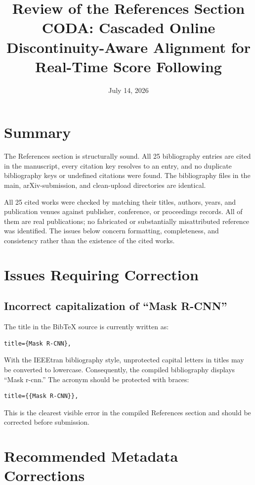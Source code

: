 \documentclass[11pt]{article}
\title{Review of the References Section\\\large CODA: Cascaded Online Discontinuity-Aware Alignment for Real-Time Score Following}
\author{}
\date{July 14, 2026}
\begin{document}
\maketitle

\section{Summary}

The References section is structurally sound. All 25 bibliography entries are cited in the manuscript, every citation key resolves to an entry, and no duplicate bibliography keys or undefined citations were found. The bibliography files in the main, arXiv-submission, and clean-upload directories are identical.

All 25 cited works were checked by matching their titles, authors, years, and publication venues against publisher, conference, or proceedings records. All of them are real publications; no fabricated or substantially misattributed reference was identified. The issues below concern formatting, completeness, and consistency rather than the existence of the cited works.

\section{Issues Requiring Correction}

\subsection{Incorrect capitalization of ``Mask R-CNN''}

The title in the BibTeX source is currently written as:

\begin{verbatim}
title={Mask R-CNN},
\end{verbatim}

With the IEEEtran bibliography style, unprotected capital letters in titles may be converted to lowercase. Consequently, the compiled bibliography displays ``Mask r-cnn.'' The acronym should be protected with braces:

\begin{verbatim}
title={{Mask R-CNN}},
\end{verbatim}

This is the clearest visible error in the compiled References section and should be corrected before submission.

\section{Recommended Metadata Corrections}
\end{document}
